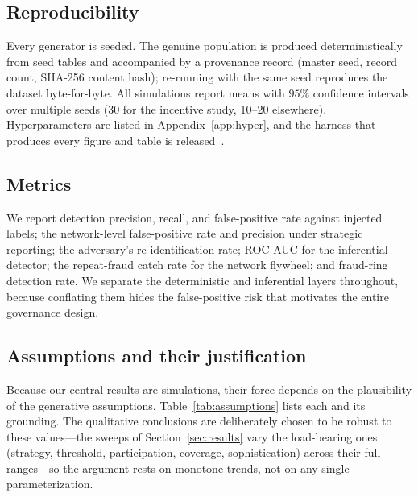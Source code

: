\documentclass[11pt]{article}
\begin{document}
\subsection{Reproducibility}\label{sec:repro}
Every generator is seeded. The genuine population is produced deterministically
from seed tables and accompanied by a provenance record (master seed, record
count, SHA-256 content hash); re-running with the same seed reproduces the dataset
byte-for-byte. All simulations report means with $95\%$ confidence intervals over
multiple seeds (30 for the incentive study, 10--20 elsewhere). Hyperparameters are
listed in Appendix~\ref{app:hyper}, and the harness that produces every figure and
table is released~\cite{truthhirecode}.

\subsection{Metrics}\label{sec:metrics}
We report detection precision, recall, and false-positive rate against injected
labels; the network-level false-positive rate and precision under strategic
reporting; the adversary's re-identification rate; ROC-AUC for the inferential
detector; the repeat-fraud catch rate for the network flywheel; and fraud-ring
detection rate. We separate the deterministic and inferential layers throughout,
because conflating them hides the false-positive risk that motivates the entire
governance design.

\subsection{Assumptions and their justification}\label{sec:assumptions}
Because our central results are simulations, their force depends on the
plausibility of the generative assumptions. Table~\ref{tab:assumptions} lists each
and its grounding. The qualitative conclusions are deliberately chosen to be
robust to these values---the sweeps of Section~\ref{sec:results} vary the
load-bearing ones (strategy, threshold, participation, coverage, sophistication)
across their full ranges---so the argument rests on monotone trends, not on any
single parameterization.
\end{document}

